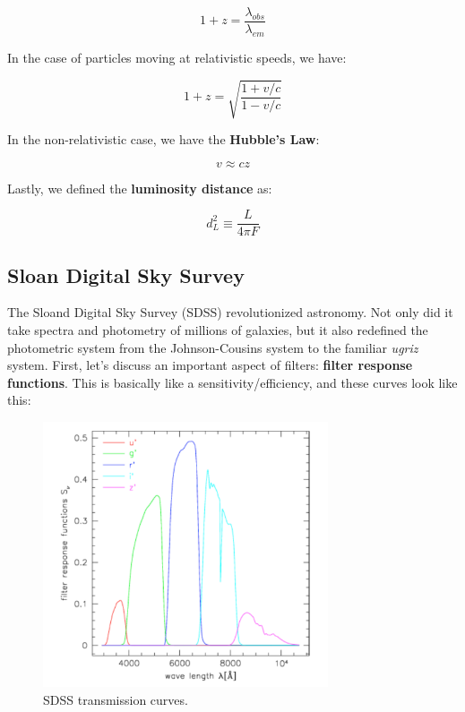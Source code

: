 \documentclass{article}
\begin{document}
\begin{equation}
    \boxed{1+z = \frac{\lambda_{obs}}{\lambda_{em}}}
\end{equation}

In the case of particles moving at relativistic speeds, we have:

\begin{equation}
    1+z = \sqrt{\frac{1+v/c}{1-v/c}}
\end{equation}

In the non-relativistic case, we have the \textbf{Hubble's Law}:

\begin{equation}
    v \approx cz
\end{equation}

Lastly, we defined the \textbf{luminosity distance} as:

\begin{equation}
    d_L^2 \equiv \frac{L}{4\pi F}
\end{equation}

\subsection{Sloan Digital Sky Survey}

The Sloand Digital Sky Survey (SDSS) revolutionized astronomy. Not only did it take spectra and photometry of millions of galaxies, but it also redefined the photometric system from the Johnson-Cousins system to the familiar \textit{ugriz} system. First, let's discuss an important aspect of filters: \textbf{filter response functions}. This is basically like a sensitivity/efficiency, and these curves look like this: 

\begin{figure}
    \centering
    \includegraphics[width=0.75\textwidth]{figs/Screen Shot 2021-08-27 at 2.12.21 PM.png}
    \caption{SDSS transmission curves.}
    \label{fig:trans_curves}
\end{figure}
\end{document}
